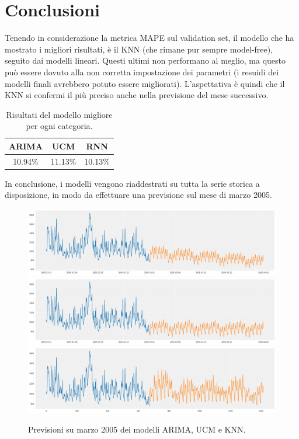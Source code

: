 
\vspace{1cm}
{\let\clearpage\relax \chapter{Conclusioni}} 

Tenendo in considerazione la metrica MAPE sul validation set, il modello che ha mostrato i migliori risultati, è il KNN (che rimane pur sempre model-free), seguito dai modelli lineari. Questi ultimi non performano al meglio, ma questo può essere dovuto alla non corretta impostazione dei parametri (i resuidi dei modelli finali avrebbero potuto essere migliorati). L'aspettativa è quindi che il KNN si confermi il più preciso anche nella previsione del mese successivo.

\vspace{0.2cm}


\begin{table}[H]
    \centering
    \begin{tabular}{||c|c|c||} 
        \hline
        ARIMA & UCM & RNN \\ 
        \hline
        10.94\% & 11.13\% & 10.13\% \\
        \hline
    \end{tabular}
    \caption{Risultati del modello migliore per ogni categoria. }
\end{table}

\vspace{0.5cm}

In conclusione, i modelli vengono riaddestrati su tutta la serie storica a disposizione, in modo da effettuare una previsione sul mese di marzo 2005. 



\begin{figure}[H]
\centering
\includegraphics[width=14cm]{Pictures/prediction_marzo_arima.png}
\includegraphics[width=14cm]{Pictures/prediction_marzo_ucm.png}
\includegraphics[width=14cm]{Pictures/prediction_marzo_knn.png}
\caption{Previsioni su marzo 2005 dei modelli ARIMA, UCM e KNN.}
\end{figure}
